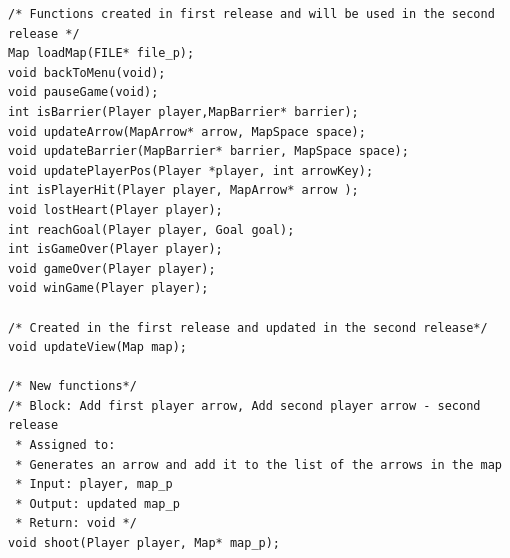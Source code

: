 \begin{verbatim}
/* Functions created in first release and will be used in the second release */
Map loadMap(FILE* file_p);
void backToMenu(void);
void pauseGame(void);
int isBarrier(Player player,MapBarrier* barrier);
void updateArrow(MapArrow* arrow, MapSpace space);
void updateBarrier(MapBarrier* barrier, MapSpace space);
void updatePlayerPos(Player *player, int arrowKey);
int isPlayerHit(Player player, MapArrow* arrow );
void lostHeart(Player player);
int reachGoal(Player player, Goal goal);
int isGameOver(Player player);
void gameOver(Player player);
void winGame(Player player);

/* Created in the first release and updated in the second release*/
void updateView(Map map);

/* New functions*/
/* Block: Add first player arrow, Add second player arrow - second release
 * Assigned to:
 * Generates an arrow and add it to the list of the arrows in the map
 * Input: player, map_p
 * Output: updated map_p
 * Return: void */
void shoot(Player player, Map* map_p);
\end{verbatim}